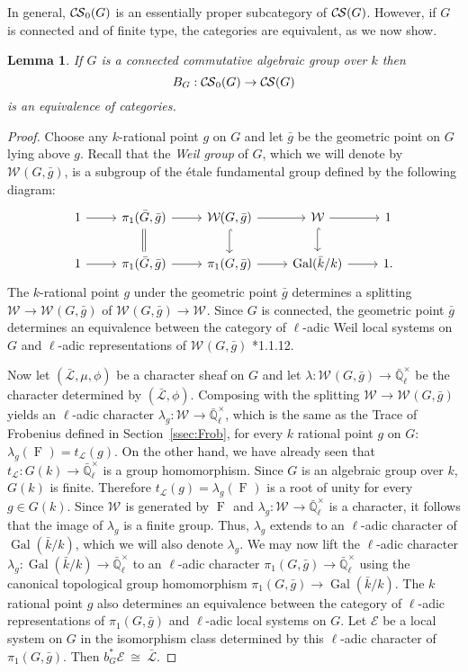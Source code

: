 \documentclass[10pt]{amsart}
\theoremstyle{plain}
\newtheorem{lemma}[theorem]{Lemma}
\theoremstyle{definition}
\newcommand{\EE}{\mathbb{\bar Q}_\ell}
\newcommand{\bFq}{\bar{k}}
\newcommand{\Fq}{k}
\newcommand{\EEx}{\EE^\times}
\newcommand{\Weil}[1]{\mathcal{W}_{#1}}
\DeclareMathOperator{\Gal}{Gal}
\newcommand{\Frob}[1]{\operatorname{F}_{#1}}
\newcommand{\iso}{{\ \cong\ }}
\newcommand{\trFrob}[1]{t_{#1}}
\newcommand{\cs}[1]{{\mathcal{#1}}}
\newcommand{\gcs}[1]{{\mathcal{\bar #1}}}
\newcommand{\CS}{{\mathcal{C\hskip-0.8pt S}}}
\newcommand{\bCS}{{\CS_0}}
\newcommand{\bg}{{\bar{g}}}
\newcommand{\bG}{\bar{G}}
\begin{document}
In general, $\bCS(G)$ is an essentially
proper subcategory of $\CS(G)$. 
However, if $G$ is connected and of finite type, the categories are equivalent, as we now show.

\begin{lemma}\label{lem:bounded_connected}
If $G$ is a connected commutative algebraic group over $\Fq$ then 
\[
B_G : \bCS(G) \to \CS(G)
\]
 is an equivalence of categories.
\end{lemma}

\begin{proof}
Choose any $\Fq$-rational point $g$ on $G$ and let $\bg$ be the geometric point on $G$ lying above $g$.
Recall that the \emph{Weil group} of $G$, which we will denote by $\Weil{}(G,\bg)$, is a subgroup of the \'etale
fundamental group defined by the following diagram:
\[
 \begin{tikzcd}
 1 \rar & \ar[equal]{d} \pi_1(\bG, \bg) \rar & \Weil{}(G,\bg) \rar \dar[hook] & \Weil{} \rar \dar[hook] & 1 \\
 1 \rar &  \pi_1(\bG, \bg) \rar & \pi_1(G,\bg) \rar & \Gal(\bFq/\Fq) \rar & 1.
 \end{tikzcd}
\]
The $\Fq$-rational point $g$ under the geometric point $\bg$ determines a splitting
$\Weil{}\to \Weil{}(G,\bg)$ of $\Weil{}(G,\bg)\to \Weil{}$.
%
  Since $G$ is connected, the geometric point $\bg$ determines
  an equivalence between the category of $\ell$-adic Weil local systems on $G$ and
  $\ell$-adic representations of $\Weil{}(G,\bg)$ \cite{deligne:80a}*{1.1.12}.
  
  Now let $(\gcs{L},\mu,\phi)$ be a character sheaf on $G$
  and let $\lambda : \Weil{}(G, \bg) \to \EEx$ be the character determined by $(\gcs{L},\phi)$.
  Composing with the splitting $\Weil{} \to \Weil{}(G,\bg)$ yields an $\ell$-adic character
  $\lambda_g : \Weil{} \to \EEx$, which is the same as the Trace of Frobenius defined in Section~\ref{ssec:Frob}, for every $\Fq$ rational point $g$ on $G$:
  $
  \lambda_g(\Frob{}) =  \trFrob{\cs{L}}(g).
  $
%
  On the other hand, we have already seen that $\trFrob{\cs{L}} : G(\Fq) \to \EEx$
  is a group homomorphism. 
  Since $G$ is an algebraic group over $\Fq$, $G(\Fq)$ is finite.
  Therefore $\trFrob{\cs{L}}(g) = \lambda_g(\Frob{})$ is a root of unity
  for every $g\in G(\Fq)$.  Since $\Weil{}$ is generated by
  $\Frob{}$ and $\lambda_g : \Weil{} \to \EEx$ is
  a character, it follows that the image of $\lambda_g$ is a finite group.
  Thus, $\lambda_g$ extends to an $\ell$-adic character of $\Gal(\bFq/\Fq)$,
  which we will also denote $\lambda_g$.
%
  We may now lift the $\ell$-adic character $\lambda_g : \Gal(\bFq/\Fq) \to \EEx$
  to an $\ell$-adic character $\pi_1(G,\bg) \to \EEx$ using the canonical topological group homomorphism
  $\pi_1(G,\bg) \to \Gal(\bFq/\Fq)$. 
  The $\Fq$ rational point $g$ also
  determines an equivalence between the category of $\ell$-adic
  representations of $\pi_1(G,\bg)$ and $\ell$-adic local systems on $G$. Let
  $\cs{E}$ be a local system on $G$ in the isomorphism class
  determined by this $\ell$-adic character of $\pi_1(G,\bg)$.
  Then $b_G^*\cs{E} \iso \gcs{L}$.
  

\end{proof}
\end{document}
